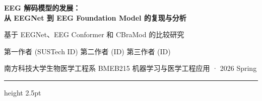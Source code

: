 \documentclass[12pt, a0paper]{article}
\begin{document}
\begin{center}
    {\fontsize{58}{68}\selectfont\bfseries\color{myblue}
        EEG 解码模型的发展：\\[3mm]
        从 EEGNet 到 EEG Foundation Model 的复现与分析\\[8mm]
    }

    {\fontsize{30}{38}\selectfont\color{mygray}
        基于 EEGNet、EEG Conformer 和 CBraMod 的比较研究\\[10mm]
    }

    {\fontsize{28}{34}\selectfont
        第一作者 (SUSTech ID) \hspace{2em} 第二作者 (ID) \hspace{2em} 第三作者 (ID)\\[4mm]
    }

    {\fontsize{20}{28}\selectfont\color{mygray}
        南方科技大学生物医学工程系 \hspace{3em}
        BMEB215 机器学习与医学工程应用 · 2026 Spring
    }

    \vspace{6mm}
    {\color{myblue}\hrule height 2.5pt}
    \vspace{6mm}
\end{center}
\end{document}
